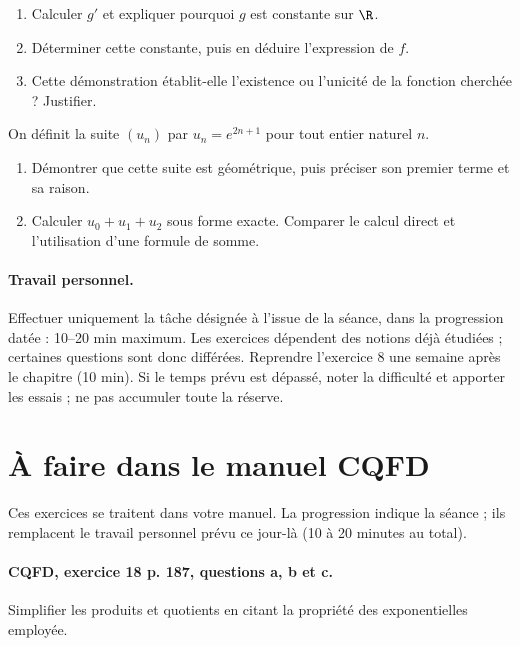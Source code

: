 \begin{enumerate}[label=\arabic*.]
\item Calculer $g\prime$ et expliquer pourquoi $g$ est constante sur $\R$.
\item Déterminer cette constante, puis en déduire l’expression de $f$.
\item Cette démonstration établit-elle l’existence ou l’unicité de la fonction cherchée ? Justifier.
\end{enumerate}
On définit la suite $(u_n)$ par $u_n=e^{2n+1}$ pour tout entier naturel $n$.
\begin{enumerate}[label=\arabic*.]
\item Démontrer que cette suite est géométrique, puis préciser son premier terme et sa raison.
\item Calculer $u_0+u_1+u_2$ sous forme exacte. Comparer le calcul direct et l’utilisation d’une formule de somme.
\end{enumerate}
\paragraph{Travail personnel.} Effectuer uniquement la tâche désignée à l’issue de la séance, dans la progression datée : 10–20 min maximum. Les exercices dépendent des notions déjà étudiées ; certaines questions sont donc différées. Reprendre l’exercice 8 une semaine après le chapitre (10 min). Si le temps prévu est dépassé, noter la difficulté et apporter les essais ; ne pas accumuler toute la réserve.
\endgroup
{}\section*{À faire dans le manuel CQFD}
Ces exercices se traitent dans votre manuel. La progression indique la séance ; ils remplacent le travail personnel prévu ce jour-là (10 à 20 minutes au total).
\paragraph{CQFD, exercice 18 p. 187, questions a, b et c.}\label{C09-M1} Simplifier les produits et quotients en citant la propriété des exponentielles employée.
